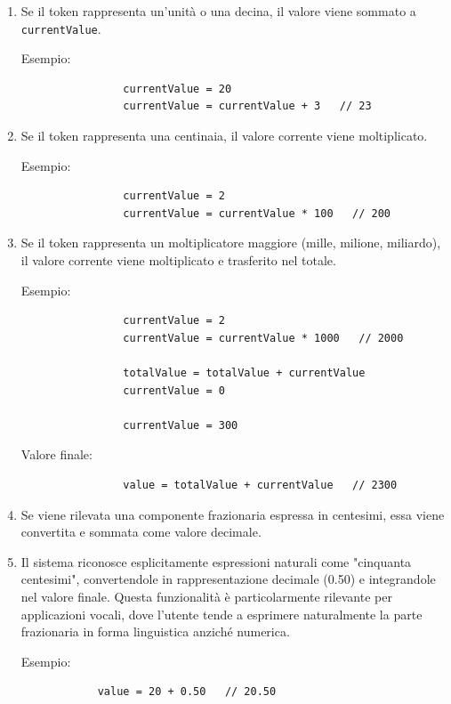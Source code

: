 \begin{enumerate}

    \item Se il token rappresenta un'unità o una decina, il valore viene sommato a \texttt{currentValue}.

        Esempio:

        \medskip

            \begin{lstlisting}
                currentValue = 20
                currentValue = currentValue + 3   // 23
            \end{lstlisting}

    \newpage
    \item Se il token rappresenta una centinaia, il valore corrente viene moltiplicato.

        Esempio:

          \medskip

            \begin{lstlisting}
                currentValue = 2
                currentValue = currentValue * 100   // 200
            \end{lstlisting}

    \item Se il token rappresenta un moltiplicatore maggiore (mille, milione, miliardo), il valore corrente viene moltiplicato e trasferito nel totale.

        Esempio:
         
        \medskip
            \begin{lstlisting}
                currentValue = 2
                currentValue = currentValue * 1000   // 2000

                totalValue = totalValue + currentValue
                currentValue = 0

                currentValue = 300
            \end{lstlisting}

        Valore finale:
        \medskip

            \begin{lstlisting}
                value = totalValue + currentValue   // 2300
            \end{lstlisting}

    \item Se viene rilevata una componente frazionaria espressa in centesimi, essa viene convertita e sommata come valore decimale.
    \item Il sistema riconosce esplicitamente espressioni naturali come "cinquanta centesimi", convertendole in rappresentazione decimale (0.50) e integrandole nel valore finale. Questa funzionalità è particolarmente rilevante per applicazioni vocali, dove l'utente tende a esprimere naturalmente la parte frazionaria in forma linguistica anziché numerica.

        Esempio:
        \medskip

            \begin{lstlisting}
            value = 20 + 0.50   // 20.50
            \end{lstlisting}

\end{enumerate}

